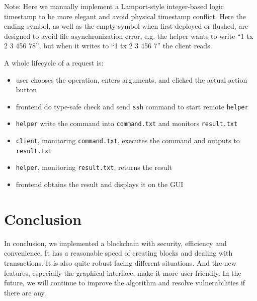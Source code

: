 \documentclass[12pt]{article}
\begin{document}
Note: Here we manually implement a Lamport-style integer-based logic timestamp to be more elegant and avoid physical timestamp conflict. Here the ending symbol, as well as the empty symbol when first deployed or flushed, are designed to avoid file asynchronization error, e.g. the helper wants to write ``1 tx 2 3 456 78'', but when it writes to ``1 tx 2 3 456 7'' the client reads.

A whole lifecycle of a request is:

\begin{itemize}
    \item user chooses the operation, enters arguments, and clicked the actual action button
    \item frontend do type-safe check and send \texttt{ssh} command to start remote \texttt{helper}
    \item \texttt{helper} write the command into \texttt{command.txt} and monitors \texttt{result.txt}
    \item \texttt{client}, monitoring \texttt{command.txt}, executes the command and outputs to \texttt{result.txt}
    \item \texttt{helper}, monitoring \texttt{result.txt}, returns the result
    \item frontend obtains the result and displays it on the GUI
\end{itemize}

\section{Conclusion}
In conclusion, we implemented a blockchain with security, efficiency and convenience. It has a reasonable speed of creating blocks and dealing with transactions.
It is also quite robust facing different situations. And the new features, especially the graphical interface, make it more user-friendly. In the future, we will continue to improve the algorithm and resolve vulnerabilities if there are any. 



\end{document}
